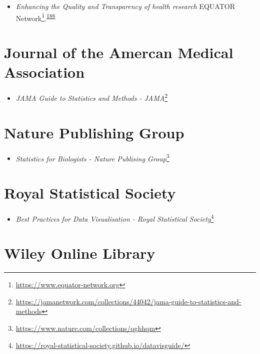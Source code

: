\documentclass[
]{book}
\providecommand{\tightlist}{%
  \setlength{\itemsep}{0pt}\setlength{\parskip}{0pt}}
\renewcommand{\href}[2]{#2\footnote{\url{#1}}}
\begin{document}
\begin{itemize}
\tightlist
\item
  \emph{Enhancing the Quality and Transparency of health research} \href{https://www.equator-network.org}{EQUATOR Network}.\textsuperscript{\protect\hyperlink{ref-Altman2008}{188}}
\end{itemize}

\hypertarget{journal-of-the-amercan-medical-association}{%
\section*{Journal of the Amercan Medical Association}\label{journal-of-the-amercan-medical-association}}

\begin{itemize}
\tightlist
\item
  \href{https://jamanetwork.com/collections/44042/jama-guide-to-statistics-and-methods}{\emph{JAMA Guide to Statistics and Methods - JAMA}}
\end{itemize}

\hypertarget{nature-publishing-group}{%
\section*{Nature Publishing Group}\label{nature-publishing-group}}

\begin{itemize}
\tightlist
\item
  \href{https://www.nature.com/collections/qghhqm}{\emph{Statistics for Biologists - Nature Publising Group}}
\end{itemize}

\hypertarget{royal-statistical-society}{%
\section*{Royal Statistical Society}\label{royal-statistical-society}}

\begin{itemize}
\tightlist
\item
  \href{https://royal-statistical-society.github.io/datavisguide/}{\emph{Best Practices for Data Visualisation - Royal Statistical Society}}
\end{itemize}

\hypertarget{wiley-online-library}{%
\section*{Wiley Online Library}\label{wiley-online-library}}
\end{document}
